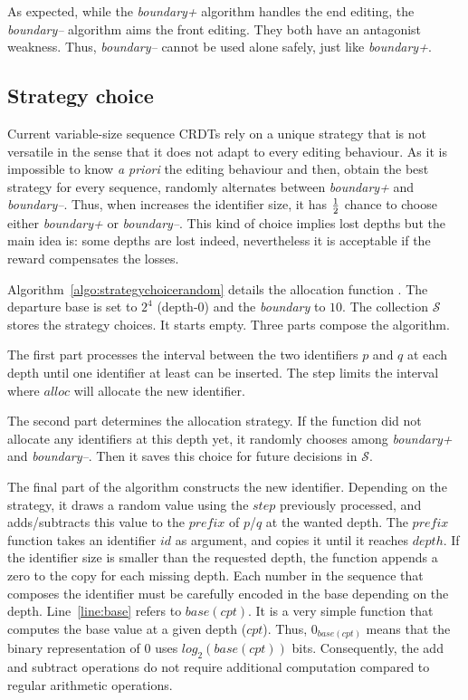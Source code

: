 As expected, while the \emph{boundary+} algorithm handles the end editing,
the \emph{boundary--} algorithm aims the front editing. They both have
an antagonist weakness. Thus, \emph{boundary--} cannot be used alone safely,
just like \emph{boundary+}.

\subsection{Strategy choice}

Current variable-size sequence CRDTs rely on a unique strategy that is not
versatile in the sense that it does not adapt to every editing behaviour. As it
is impossible to know \emph{a priori} the editing behaviour and then, obtain
the best strategy for every sequence, \NAME{} randomly alternates between
\emph{boundary+} and \emph{boundary--}. Thus, when \NAME{} increases the
identifier size, it has $1\over{2}$ chance to choose either \emph{boundary+} or
\emph{boundary--}. This kind of choice implies lost depths but the main idea
is: some depths are lost indeed, nevertheless it is acceptable if the reward
compensates the losses.



Algorithm~\ref{algo:strategychoicerandom} details the allocation function
\NAME{}. The departure base is set to $2^4$ (depth-0) and the \emph{boundary}
to $10$. The collection $\mathcal{S}$ stores the strategy choices. It starts
empty. Three parts compose the algorithm.
\begin{inparaenum}[(1)]
\item The first part processes the interval between the two identifiers $p$ and
  $q$ at each depth until one identifier at least can be inserted. The step
  limits the interval where $alloc$ will allocate the new identifier.
  \item The second part determines the allocation strategy. If the function did
    not allocate any identifiers at this depth yet, it randomly chooses among
    \emph{boundary+} and \emph{boundary--}. Then it saves this choice for
    future decisions in $\mathcal{S}$.
  \item The final part of the algorithm constructs the new
    identifier. Depending on the strategy, it draws a random value using the
    $step$ previously processed, and adds/subtracts this value to the $prefix$
    of $p$/$q$ at the wanted depth. The $prefix$ function takes an identifier
    $id$ as argument, and copies it until it reaches $depth$. If the identifier
    size is smaller than the requested depth, the function appends a zero to
    the copy for each missing depth. Each number in the sequence that composes
    the identifier must be carefully encoded in the base depending on the
    depth. Line~\ref{line:base} refers to $base(cpt)$. It is a very simple
    function that computes the base value at a given depth ($cpt$). Thus,
    $0_{base(cpt)}$ means that the binary representation of $0$ uses
    $log_2(base(cpt))$ bits. Consequently, the add and subtract operations do
    not require additional computation compared to regular arithmetic
    operations.
\end{inparaenum}

